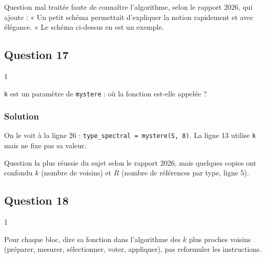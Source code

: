 \documentclass[11pt,a4paper]{article}
\newcommand{\equationajustee}[1]{%
  \sbox{\boiteequation}{$\displaystyle #1$}%
  \ifdim\wd\boiteequation>\linewidth
    \[\resizebox{\linewidth}{!}{\usebox{\boiteequation}}\]%
  \else
    \[#1\]%
  \fi}
\begin{document}
\begin{jury}

Question mal traitée faute de connaître l'algorithme, selon le rapport 2026, qui ajoute : « Un petit schéma permettait d'expliquer la notion rapidement et avec élégance. » Le schéma ci-dessus en est un exemple.

\end{jury}

\hypertarget{question-17}{%
\subsection{Question 17}\label{question-17}}

\begin{indication}{1}

\texttt{k} est un paramètre de \texttt{mystere} : où la fonction est-elle appelée ?

\end{indication}

\hypertarget{solution-16}{%
\subsubsection{Solution}\label{solution-16}}

\equationajustee{\boxed{k = 8}}

On le voit à la ligne 26 : \texttt{type\_spectral\ =\allowbreak{}\ mystere(\allowbreak{}S,\allowbreak{}\ 8)\allowbreak{}}. La ligne 13 utilise \texttt{k} mais ne fixe pas sa valeur.

\begin{piege}

Question la plus réussie du sujet selon le rapport 2026, mais quelques copies ont confondu \(k\) (nombre de voisins) et \(R\) (nombre de références par type, ligne 5).

\end{piege}

\hypertarget{question-18}{%
\subsection{Question 18}\label{question-18}}

\begin{indication}{1}

Pour chaque bloc, dire sa fonction dans l'algorithme des \(k\) plus proches voisins (préparer, mesurer, sélectionner, voter, appliquer), pas reformuler les instructions.

\end{indication}
\end{document}
